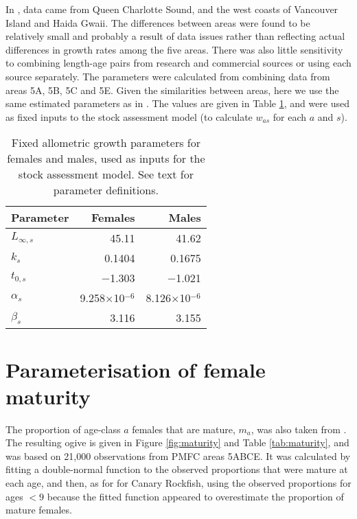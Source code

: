 In \citet{Edwards-etal:2012pop}, data came from Queen Charlotte Sound, and the west coasts of Vancouver Island and Haida Gwaii. The differences between areas were found to be relatively small and probably a result of data issues rather than reflecting actual differences in growth rates among the five areas. There was also little sensitivity to combining length-age pairs from research and commercial sources or using each source separately. The parameters were calculated from combining data from areas 5A, 5B, 5C and 5E. Given the similarities between areas, here we use the same estimated parameters as in \citet{Edwards-etal:2012pop}. The values are given in Table \ref{tab:biolPars}, and were used as fixed inputs to the stock assessment model (to calculate $w_{as}$ for each $a$ and $s$).

\begin{table}[b]                 %
\centering                        %
\caption{\label{tab:biolPars} Fixed allometric growth parameters for females and males, used as inputs for the stock assessment model. See text for parameter definitions.}
\begin{tabular}{lrr} 
\hline
Parameter & Females & Males\\
\hline 
$L_{\infty,s}$ & 45.11 & 41.62 \\
$k_s$ & 0.1404 & 0.1675 \\
$t_{0,s}$ & $-$1.303 & $-$1.021 \\
$\alpha_s$ & 9.258$\times$10$^{-6}$ & 8.126$\times$10$^{-6}$\\
$\beta_s$ & 3.116 & 3.155 \\
\hline
\end{tabular}	
\end{table}

\section{Parameterisation of female maturity}

The proportion of age-class $a$ females that are mature, $m_a$, was also taken from \citet{Edwards-etal:2012pop}. The resulting ogive is given in Figure \ref{fig:maturity} and Table \ref{tab:maturity}, and was based on 21,000 observations from PMFC areas 5ABCE. It was calculated by fitting a double-normal function to the observed proportions that were mature at each age, and then, as for \citet{sso09} for Canary Rockfish, using the observed proportions for ages $<9$ because the fitted function appeared to overestimate the proportion of mature females.

